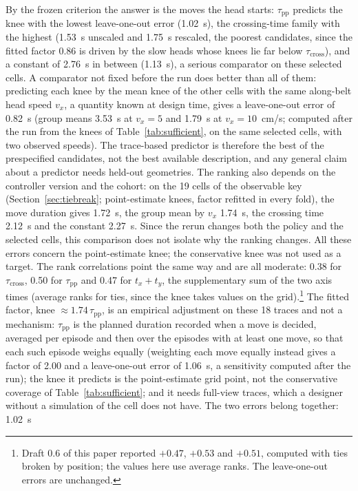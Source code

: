 \documentclass[11pt,a4paper]{article}
\newcommand{\tcross}{\tau_{\mathrm{cross}}}
\newcommand{\tpp}{\tau_{\mathrm{pp}}}
\begin{document}
By the frozen criterion the answer is the moves the head starts: $\tpp$ predicts the
knee with the lowest leave-one-out error (1.02~s), the crossing-time family with the
highest (1.53~s unscaled and 1.75~s rescaled, the poorest candidates, since the fitted
factor 0.86 is driven by the slow heads whose knees lie far below $\tcross$), and a
constant of 2.76~s in between (1.13~s), a serious comparator on these selected cells. A
comparator not fixed before the run does better than all of them: predicting each knee by
the mean knee of the other cells with the same along-belt head speed $v_x$, a quantity known
at design time, gives a leave-one-out error of 0.82~s (group means 3.53~s at $v_x=5$ and
1.79~s at $v_x=10$~cm/s; computed after the run from the knees of
Table~\ref{tab:sufficient}, on the same selected cells, with two observed speeds). The
trace-based predictor is therefore the best of the prespecified candidates, not the best
available description, and any general claim about a predictor needs held-out geometries.
The ranking also depends on the controller version and the cohort: on the 19 cells of the
observable key (Section~\ref{sec:tiebreak}; point-estimate knees, factor refitted in
every fold), the move duration gives 1.72~s, the group mean by $v_x$ 1.74~s, the crossing
time 2.12~s and the constant 2.27~s. Since the rerun changes both the policy and the
selected cells, this comparison does not isolate why the ranking changes. All these
errors concern the point-estimate knee; the conservative knee was not used as a target.
The rank correlations point the same way and are all moderate: 0.38 for $\tcross$, 0.50
for $\tpp$ and 0.47 for $t_x+t_y$, the supplementary sum of the two axis times (average
ranks for ties, since the knee takes values on the grid).\footnote{Draft 0.6 of this paper reported $+0.47$, $+0.53$ and $+0.51$, computed
with ties broken by position; the values here use average ranks. The leave-one-out errors
are unchanged.} The fitted factor, knee $\approx1.74\,\tpp$, is an empirical adjustment on
these 18 traces and not a mechanism: $\tpp$ is the planned duration recorded when a move
is decided, averaged per episode and then over the episodes with at least one move, so
that each such episode weighs equally (weighting each move equally instead gives a
factor of 2.00 and a leave-one-out error of 1.06~s, a sensitivity computed after the
run); the knee it predicts is the point-estimate grid point, not the conservative
coverage of Table~\ref{tab:sufficient}; and it needs full-view traces, which a designer
without a simulation of the cell does not have. The two errors belong together: 1.02~s
\end{document}
